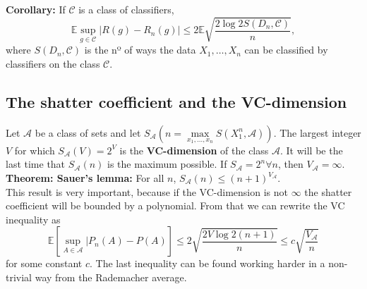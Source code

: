 \documentclass[11pt, english]{article}
\begin{document}
 \textbf{Corollary:} If $\mathcal{C}$ is a class of classifiers, \begin{equation}
 	\mathbb{E}\underset{g\in\mathcal{C}}{\sup}|R(g)-R_n(g)|\leq 2\mathbb{E}\sqrt{\frac{2\log 2S(D_n,\mathcal{C})}{n}},
 \end{equation} where $S(D_n,\mathcal{C})$ is the nº of ways the data $X_1,\dots,X_n$ can be classified by classifiers on the class $\mathcal{C}$.\\
 
\subsection*{The shatter coefficient and the VC-dimension}
Let $\mathcal{A}$ be a class of sets and let $S_{\mathcal{A}}(n=\underset{x_1,\dots,x_n}{\max}S(X_1^n,\mathcal{A}))$. The largest integer $V$ for which $S_{\mathcal{A}}(V)=2^V$ is the \textbf{VC-dimension} of the class $\mathcal{A}$. It will be the last time that $S_{\mathcal{A}}(n)$ is the maximum possible. If $S_{\mathcal{A}}=2^n\forall n$, then $V_{\mathcal{A}}=\infty$.\\
 
\textbf{Theorem: Sauer's lemma:} For all $n$, $S_{\mathcal{A}}(n)\leq (n+1)^{V_{\mathcal{A}}}$.\\
 
This result is very important, because if the VC-dimension is not $\infty$ the shatter coefficient will be bounded by a polynomial. From that we can rewrite the VC inequality as 
\begin{equation}
 	\mathbb{E}[\underset{A\in\mathcal{A}}{\sup}|P_n(A)-P(A)]\leq 2\sqrt{\frac{2V\log 2(n+1)}{n}}\leq c\sqrt{\frac{V_{\mathcal{A}}}{n}}
\end{equation}
for some constant $c$. The last inequality can be found working harder in a non-trivial way from the Rademacher average.\\
\end{document}
